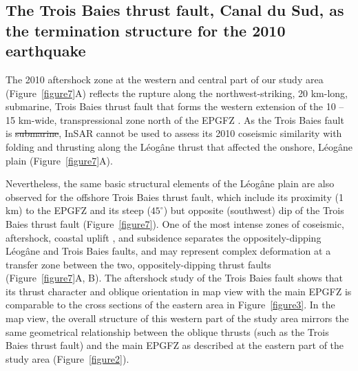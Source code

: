 \documentclass[linenumbers,draft]{agujournal}
\providecommand{\DIFaddtex}[1]{{\protect\color{blue}\uwave{#1}}} %
\providecommand{\DIFdeltex}[1]{{\protect\color{red}\sout{#1}}}                      %
\providecommand{\DIFaddbegin}{} %
\providecommand{\DIFaddend}{} %
\providecommand{\DIFdelbegin}{} %
\providecommand{\DIFdelend}{} %
\providecommand{\DIFadd}[1]{\texorpdfstring{\DIFaddtex{#1}}{#1}} %
\providecommand{\DIFdel}[1]{\texorpdfstring{\DIFdeltex{#1}}{}} %
\begin{document}
\subsection{The Trois Baies thrust fault, Canal du Sud, as the termination structure for the 2010 earthquake}
The 2010 aftershock zone at the western and central part of our study area (Figure~\ref{figure7}A) reflects the rupture along the northwest-striking, 20 km-long, submarine, Trois Baies thrust fault that forms the western extension of the 10 -- 15 km-wide, transpressional zone north of the EPGFZ \citep{mercier20112010}. As the Trois Baies fault is \DIFdelbegin \DIFdel{submarine}\DIFdelend \DIFaddbegin \DIFadd{is a submarine fault}\DIFaddend , InSAR cannot be used to assess its 2010 coseismic similarity with folding and thrusting along the L\'eog\^ane thrust that affected the onshore, L\'eog\^ane plain (Figure~\ref{figure7}A). 

Nevertheless, the same basic structural elements of the L\'eog\^ane plain are also observed for the offshore Trois Baies thrust fault, which include its proximity (1 km) to the EPGFZ and its steep ($45^{\circ}$) but opposite (southwest) dip of the Trois Baies thrust fault (Figure~\ref{figure7}). One of the most intense zones of \DIFaddbegin \DIFadd{2010 }\DIFaddend coseismic, aftershock, coastal uplift \citep{hashimoto2011fan}, and subsidence \citep{prentice2010seismic} separates the oppositely-dipping L\'eog\^ane and Trois Baies faults, and may represent complex deformation at a transfer zone between the two, oppositely-dipping thrust faults (Figure~\ref{figure7}A, B). The aftershock study of the Trois Baies fault \citep{symithe2016present} shows that its thrust character and oblique orientation in map view with the main EPGFZ is comparable to the cross sections of the eastern area in Figure~\ref{figure3}. In the map view, the overall structure of this western part of the study area mirrors the same geometrical relationship between the oblique thrusts (such as the Trois Baies thrust fault) and the main EPGFZ as described at the eastern part of the study area (Figure~\ref{figure2}).
\end{document}

